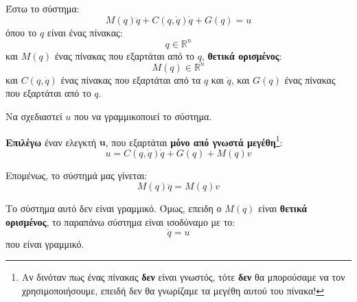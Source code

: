 \documentclass[11pt,a4paper,notitlepage,fleqn]{article}
\begin{document}
\begin{exercise}
	Έστω το σύστημα:
	\[
	M(q)\ddot q +C(q,\dot q)\dot q + G(q) = u
	\]
	όπου το \( q \) είναι ένας πίνακας:
	\[
	q \in \mathbb R^n
	\]
	και \( M(q) \) ένας πίνακας που εξαρτάται από το \( q \), \textbf{θετικά ορισμένος}:
	\[
	M(q) \in \mathbb R^n
	\]
	και \( C(q,\dot q) \) ένας πίνακας που εξαρτάται από τα \( q \) και
	\( \dot q \), και \( G(q) \) ένας πίνακας που εξαρτάται από το \( q \).
	
	Να σχεδιαστεί \( u \) που να γραμμικοποιεί το σύστημα.
	
	\tcblower
	\textbf{Επιλέγω} έναν ελεγκτή \( \textbf{u} \), που εξαρτάται
	\textbf{μόνο από γνωστά μεγέθη}\footnote{Αν δινόταν πως ένας πίνακας
		\textbf{δεν} είναι γνωστός, τότε \textbf{δεν} θα μπορούσαμε
		να τον χρησιμοποιήσουμε, επειδή δεν θα γνωρίζαμε τα μεγέθη
		αυτού του πίνακα!}:
	\[
	u = C(q,\dot q)\dot q + G(q) + M(q) v
	\]
	
	Επομένως, το σύστημά μας γίνεται:
	\[
	M(q)\ddot q = M(q) v
	\]
	
	Το σύστημα αυτό δεν είναι γραμμικό. Όμως, επειδη ο \( M(q) \) είναι
	\textbf{θετικά ορισμένος}, το παραπάνω σύστημα είναι ισοδύναμο με το:
	\[
	\ddot q = u
	\]
	που είναι γραμμικό.
\end{exercise}
\end{document}
